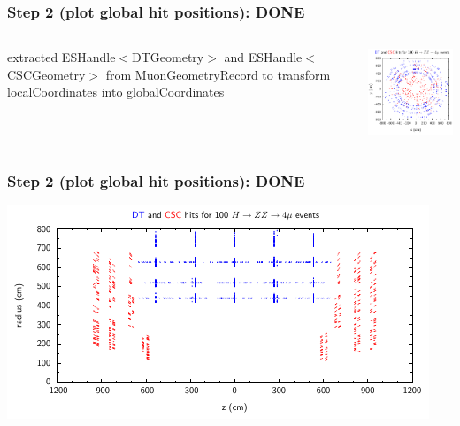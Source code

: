 \documentclass[12pt,compress]{beamer}
\begin{document}
\begin{frame}
\frametitle{Step 2 (plot global hit positions): DONE}
\begin{columns}[c]

\begin{minipage}{\linewidth}
\begin{raggedright}
\scriptsize
extracted
ESHandle$<$DTGeometry$>$ and
ESHandle$<$CSCGeometry$>$
from MuonGeometryRecord to transform localCoordinates into
globalCoordinates
\end{raggedright}
\end{minipage}

\includegraphics[width=\linewidth]{rphi_hits}
\end{columns}
\end{frame}

\begin{frame}
\frametitle{Step 2 (plot global hit positions): DONE}
\includegraphics[width=\linewidth]{rz_hits}
\end{frame}
\end{document}
